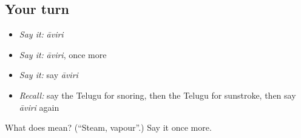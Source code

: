 \subsection*{Your turn}
\begin{itemize}
\raggedright
  \item \emph{Say it:} \emph{āviri}
  \item \emph{Say it:} \emph{āviri}, once more
  \item \emph{Say it:} say \emph{āviri}
  \item \emph{Recall:} say the Telugu for snoring, then the Telugu for sunstroke, then say \emph{āviri} again
\end{itemize}

\begin{tcolorbox}[breakable,colback=teal!4,colframe=teal!35!black,title={Before you move on}]
What does  mean? (\textquotedblleft{}Steam, vapour\textquotedblright{}.) Say it once more.
\end{tcolorbox}
